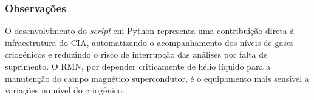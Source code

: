 \subsubsection*{Observações}

O desenvolvimento do \textit{script} em Python representa uma contribuição
direta à infraestrutura do CIA, automatizando o acompanhamento dos níveis
de gases criogênicos e reduzindo o risco de interrupção das análises por
falta de suprimento. O RMN, por depender criticamente de hélio líquido para
a manutenção do campo magnético supercondutor, é o equipamento mais
sensível a variações no nível do criogênico.
